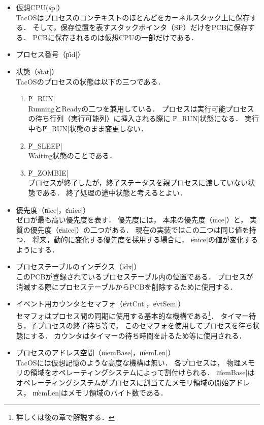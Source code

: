 \begin{itemize}
\item 仮想CPU(\|sp|） \\
TacOSはプロセスのコンテキストのほとんどをカーネルスタック上に保存する．
そして，保存位置を表すスタックポインタ（SP）だけをPCBに保存する．
PCBに保存されるのは仮想CPUの一部だけである．

\item プロセス番号（\|pid|）

\item 状態（\|stat|） \\
TacOSのプロセスの状態は以下の三つである．
\begin{enumerate}
\item \|P_RUN| \\
RunningとReadyの二つを兼用している．
プロセスは実行可能プロセスの待ち行列（実行可能列）に挿入される際に
\|P_RUN|状態になる．
実行中も\|P_RUN|状態のまま変更しない．

\item \|P_SLEEP| \\
Waiting状態のことである．

\item \|P_ZOMBIE| \\
プロセスが終了したが，終了ステータスを親プロセスに渡していない状態である．
終了処理の途中状態と考えるとよい．
\end{enumerate}

\item 優先度（\|nice|，\|enice|） \\
ゼロが最も高い優先度を表す．
優先度には，
本来の優先度（\|nice|）と，
実質の優先度（\|enice|）の二つがある．
現在の実装ではこの二つは同じ値を持つ．
将来，動的に変化する優先度を採用する場合に，
\|enice|の値が変化するようにする．

\item プロセステーブルのインデクス（\|idx|） \\
このPCBが登録されているプロセステーブル内の位置である．
プロセスが消滅する際にプロセステーブルからPCBを削除するために使用する．

\item イベント用カウンタとセマフォ（\|evtCnt|，\|evtSem|） \\
セマフォはプロセス間の同期に使用する基本的な機構である\footnote{
詳しくは後の章で解説する．}．
タイマー待ち，子プロセスの終了待ち等で，
このセマフォを使用してプロセスを待ち状態にする．
カウンタはタイマーの待ち時間を計るため等に使用される．

\item プロセスのアドレス空間（\|memBase|，\|memLen|） \\
TacOSには仮想記憶のような高度な機構は無い．
各プロセスは，
物理メモリの領域をオペレーティングシステムによって割付けられる．
\|memBase|は
オペレーティングシステムがプロセスに割当てたメモリ領域の開始アドレス，
\|memLen|はメモリ領域のバイト数である．


\end{itemize}

